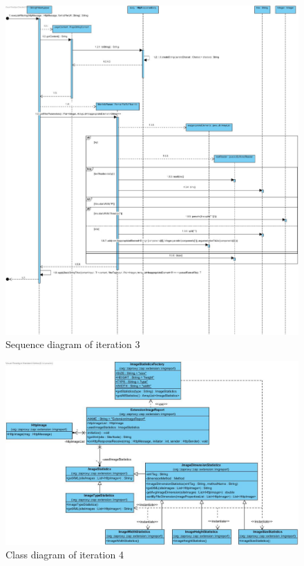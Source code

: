 \begin{figure}[h]
	\centering
	\includegraphics[width=1\textwidth]{../Diagrams/SDiteration3}
	\caption{Sequence diagram of iteration 3}
\end{figure}

\begin{figure}[h]
	\centering
	\includegraphics[width=1\textwidth]{../Diagrams/CDiteration4}
	\caption{Class diagram of iteration 4}
\end{figure}

